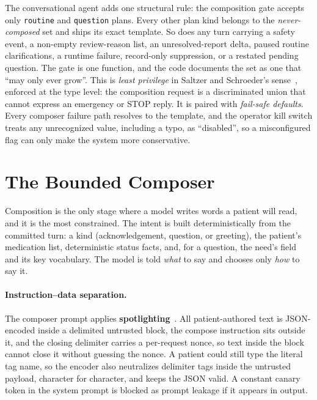 The conversational agent adds one structural rule: the composition gate accepts
only \texttt{routine} and \texttt{question} plans. Every other plan kind belongs
to the \emph{never-composed} set and ships its exact template. So does any turn
carrying a safety event, a non-empty review-reason list, an unresolved-report
delta, paused routine clarifications, a runtime failure, record-only
suppression, or a restated pending question. The gate is one function, and the
code documents the set as one that ``may only ever grow''. This is \emph{least
privilege} in Saltzer and Schroeder's sense~\cite{saltzer1975protection},
enforced at the type level: the composition request is a discriminated union
that cannot express an emergency or STOP reply. It is paired with \emph{fail-safe
defaults}. Every composer failure path resolves to the template, and the
operator kill switch treats any unrecognized value, including a typo, as
``disabled'', so a misconfigured flag can only make the system more conservative.

\section{The Bounded Composer}
\label{sec:conv-composer}

Composition is the only stage where a model writes words a patient will read,
and it is the most constrained. The intent is built deterministically from the
committed turn: a kind (acknowledgement, question, or greeting), the patient's
medication list, deterministic status facts, and, for a question, the need's
field and its key vocabulary. The model is told \emph{what} to say and chooses
only \emph{how} to say it.

\paragraph{Instruction--data separation.}
The composer prompt applies \textbf{spotlighting}~\cite{hines2024spotlighting}.
All patient-authored text is JSON-encoded inside a delimited untrusted block, the
compose instruction sits outside it, and the closing delimiter carries a
per-request nonce, so text inside the block cannot close it without guessing the
nonce. A patient could still type the literal tag name, so the encoder also
neutralizes delimiter tags inside the untrusted payload, character for
character, and keeps the JSON valid. A constant canary token in the system prompt
is blocked as prompt leakage if it appears in output.

